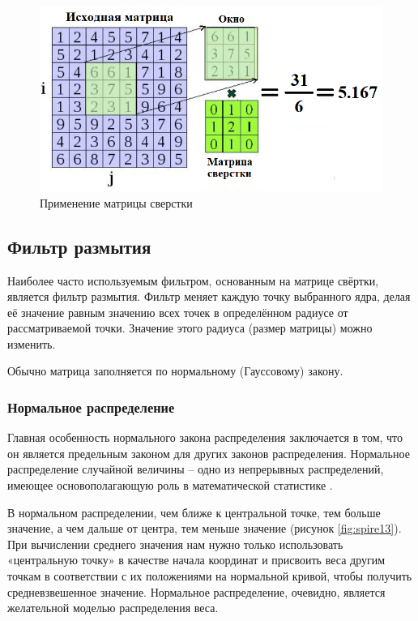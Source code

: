 \begin{figure}[hbtp]
	\centering
	\includegraphics[width=\textwidth]{img/image5.png}
	\caption{\label{fig:spire11} Применение матрицы сверстки}
\end{figure}

\subsection{Фильтр размытия}

Наиболее часто используемым фильтром, основанным на матрице свёртки, является фильтр размытия. Фильтр меняет каждую точку выбранного ядра, делая её значение равным значению всех точек в определённом радиусе от рассматриваемой точки. Значение этого радиуса (размер матрицы) можно изменить.

Обычно матрица заполняется по нормальному (Гауссовому) закону. 

\subsubsection{Нормальное распределение}
Главная особенность нормального закона распределения заключается в том, что он является предельным законом для других законов распределения. Нормальное распределение случайной величины -- одно из непрерывных распределений, имеющее основополагающую роль в математической статистике \cite{normDistr}.

В нормальном распределении, чем ближе к центральной точке, тем больше значение, а чем дальше от центра, тем меньше значение (рисунок \ref{fig:spire13}).
При вычислении среднего значения нам нужно только использовать «центральную точку» в качестве начала координат и присвоить веса другим точкам в соответствии с их положениями на нормальной кривой, чтобы получить средневзвешенное значение. Нормальное распределение, очевидно, является желательной моделью распределения веса.

